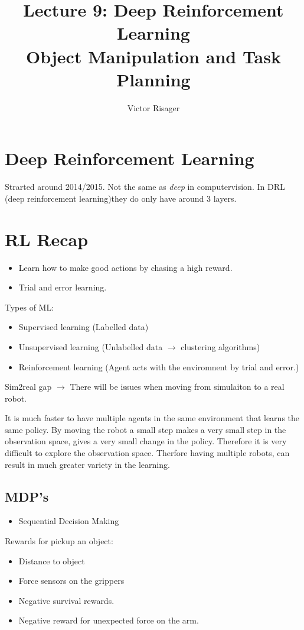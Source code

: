 \documentclass[a4paper]{article}
\title{Lecture 9: Deep Reinforcement Learning  \\
	\large Object Manipulation and Task Planning}
\author{Victor Risager}
\begin{document}
\maketitle

\section{Deep Reinforcement Learning}
Strarted around 2014/2015.
Not the same as \textit{deep} in computervision. In DRL (deep reinforcement learning)they do only have around 3 layers. 

\section{RL Recap}
\begin{itemize}
	\item Learn how to make good actions by chasing a high reward.
	\item Trial and error learning.
\end{itemize}
Types of ML:
\begin{itemize}
	\item Supervised learning (Labelled data)
	\item Unsupervised learning (Unlabelled data $ \rightarrow $ clustering algorithms)
	\item Reinforcement learning (Agent acts with the enviromnent by trial and error.)
\end{itemize}

Sim2real gap $ \rightarrow $ There will be issues when moving from simulaiton to a real robot. 

It is much faster to have multiple agents in the same environment that learns the same policy. By moving the robot a small step makes a very small step in the observation space, gives a very small change in the policy. Therefore it is very difficult to explore the observation space. Therfore having multiple robots, can result in much greater variety in the learning. 

\subsection{MDP's}
\begin{itemize}
	\item Sequential Decision Making
\end{itemize}

Rewards for pickup an object:
\begin{itemize}
	\item Distance to object
	\item Force sensors on the grippers
	\item Negative survival rewards. 
	\item Negative reward for unexpected force on the arm.
\end{itemize}
\end{document}
